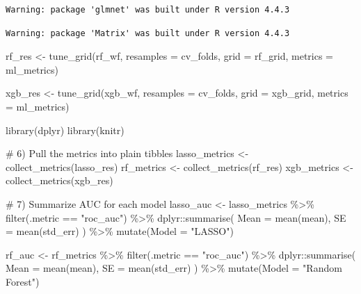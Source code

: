 \documentclass[
  letterpaper,
  DIV=11,
  numbers=noendperiod]{scrartcl}
\newenvironment{Shaded}{}{}
\newcommand{\AttributeTok}[1]{\textcolor[rgb]{0.84,0.23,0.29}{#1}}
\newcommand{\CommentTok}[1]{\textcolor[rgb]{0.42,0.45,0.49}{#1}}
\newcommand{\FunctionTok}[1]{\textcolor[rgb]{0.44,0.26,0.76}{#1}}
\newcommand{\NormalTok}[1]{\textcolor[rgb]{0.14,0.16,0.18}{#1}}
\newcommand{\OtherTok}[1]{\textcolor[rgb]{0.44,0.26,0.76}{#1}}
\newcommand{\SpecialCharTok}[1]{\textcolor[rgb]{0.00,0.36,0.77}{#1}}
\newcommand{\StringTok}[1]{\textcolor[rgb]{0.01,0.18,0.38}{#1}}
\begin{document}
\begin{verbatim}
Warning: package 'glmnet' was built under R version 4.4.3
\end{verbatim}

\begin{verbatim}
Warning: package 'Matrix' was built under R version 4.4.3
\end{verbatim}

\begin{Shaded}
\begin{Highlighting}[]
\NormalTok{rf\_res    }\OtherTok{\textless{}{-}} \FunctionTok{tune\_grid}\NormalTok{(rf\_wf,    }\AttributeTok{resamples =}\NormalTok{ cv\_folds,}
                       \AttributeTok{grid =}\NormalTok{ rf\_grid,    }\AttributeTok{metrics =}\NormalTok{ ml\_metrics)}

\NormalTok{xgb\_res   }\OtherTok{\textless{}{-}} \FunctionTok{tune\_grid}\NormalTok{(xgb\_wf,   }\AttributeTok{resamples =}\NormalTok{ cv\_folds,}
                       \AttributeTok{grid =}\NormalTok{ xgb\_grid,   }\AttributeTok{metrics =}\NormalTok{ ml\_metrics)}

\FunctionTok{library}\NormalTok{(dplyr)}
\FunctionTok{library}\NormalTok{(knitr)}

\CommentTok{\# 6) Pull the metrics into plain tibbles}
\NormalTok{lasso\_metrics }\OtherTok{\textless{}{-}} \FunctionTok{collect\_metrics}\NormalTok{(lasso\_res)}
\NormalTok{rf\_metrics    }\OtherTok{\textless{}{-}} \FunctionTok{collect\_metrics}\NormalTok{(rf\_res)}
\NormalTok{xgb\_metrics   }\OtherTok{\textless{}{-}} \FunctionTok{collect\_metrics}\NormalTok{(xgb\_res)}

\CommentTok{\# 7) Summarize AUC for each model}
\NormalTok{lasso\_auc }\OtherTok{\textless{}{-}}\NormalTok{ lasso\_metrics }\SpecialCharTok{\%\textgreater{}\%}
  \FunctionTok{filter}\NormalTok{(.metric }\SpecialCharTok{==} \StringTok{"roc\_auc"}\NormalTok{) }\SpecialCharTok{\%\textgreater{}\%}
\NormalTok{  dplyr}\SpecialCharTok{::}\FunctionTok{summarise}\NormalTok{(}
    \AttributeTok{Mean =} \FunctionTok{mean}\NormalTok{(mean),}
    \AttributeTok{SE   =} \FunctionTok{mean}\NormalTok{(std\_err)}
\NormalTok{  ) }\SpecialCharTok{\%\textgreater{}\%}
  \FunctionTok{mutate}\NormalTok{(}\AttributeTok{Model =} \StringTok{"LASSO"}\NormalTok{)}

\NormalTok{rf\_auc }\OtherTok{\textless{}{-}}\NormalTok{ rf\_metrics }\SpecialCharTok{\%\textgreater{}\%}
  \FunctionTok{filter}\NormalTok{(.metric }\SpecialCharTok{==} \StringTok{"roc\_auc"}\NormalTok{) }\SpecialCharTok{\%\textgreater{}\%}
\NormalTok{  dplyr}\SpecialCharTok{::}\FunctionTok{summarise}\NormalTok{(}
    \AttributeTok{Mean =} \FunctionTok{mean}\NormalTok{(mean),}
    \AttributeTok{SE   =} \FunctionTok{mean}\NormalTok{(std\_err)}
\NormalTok{  ) }\SpecialCharTok{\%\textgreater{}\%}
  \FunctionTok{mutate}\NormalTok{(}\AttributeTok{Model =} \StringTok{"Random Forest"}\NormalTok{)}


\end{Highlighting}
\end{Shaded}
\end{document}

